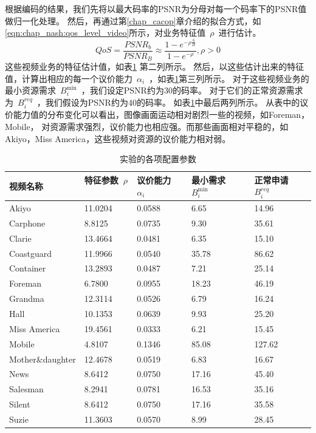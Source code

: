 根据编码的结果，我们先将以最大码率的PSNR为分母对每一个码率下的PSNR值做归一化处理。
然后，再通过第\ref{chap_cacop}章介绍的拟合方式，如\eqref{eqn:chap_nash:qos_level_video}所示，对业务特征值~$\rho$~进行估计。
\begin{equation}
QoS = \frac{PSNR_b}{PSNR_B} \approx \frac{1- e^{-\rho \frac{b}{B} }}{1-e^{-\rho}}, \rho > 0
\label{eqn:chap_nash:qos_level_video}
\end{equation}
这些视频业务的特征估计值，如表\ref{tab:chap_nash:before_simulation} 第二列所示。
然后，以这些估计出来的特征值，计算出相应的每一个议价能力~$\alpha_i$~，如表\ref{tab:chap_nash:before_simulation}第三列所示。
对于这些视频业务的最小资源需求~$B_i^{\min}$~，我们设定PSNR约为30的码率。
对于它们的正常资源需求为~$B_i^{req}$~，我们假设为PSNR约为40的码率。
如表\ref{tab:chap_nash:before_simulation}中最后两列所示。
从表中的议价能力值的分布变化可以看出，图像画面运动相对剧烈一些的视频，如Foreman，Mobile，
对资源需求强烈，议价能力也相应强。而那些画面相对平稳的，如Akiyo，Miss America，这些视频对资源的议价能力相对弱。
\begin{table}[tb]
    \wuhao
    \centering
    \caption{实验的各项配置参数}
    \begin{tabular*}{0.98\textwidth}{l p{}  p{}  p{}  p{} } 
    \toprule
    视频名称 &特征参数~$\rho$~ & 议价能力~$\alpha_i$~ & 最小需求~$B_i^{\min}$~ & 正常申请~$B_i^{req}$~ \\
    \midrule
Akiyo           	 & 11.0204 & 0.0588 & 6.65 & 14.96  \\ 
Carphone        	 & 8.8125 & 0.0735 & 9.30 & 35.61  \\ 
Clarie          	 & 13.4664 & 0.0481 & 6.35 & 15.10  \\ 
Coastguard      	 & 11.9966 & 0.0540 & 35.78 & 86.62  \\ 
Container       	 & 13.2893 & 0.0487 & 7.21 & 25.14  \\ 
Foreman         	 & 6.7800 & 0.0955 & 18.23 & 46.19  \\ 
Grandma         	 & 12.3114 & 0.0526 & 6.79 & 16.24  \\ 
Hall            	 & 10.1353 & 0.0639 & 9.93 & 25.20  \\ 
Miss America    	 & 19.4561 & 0.0333 & 6.21 & 15.45  \\ 
Mobile          	 & 4.8107 & 0.1346 & 85.08 & 127.62  \\ 
Mother\&daughter	 & 12.4678 & 0.0519 & 6.83 & 16.67  \\ 
News            	 & 8.6412 & 0.0750 & 17.16 & 45.40  \\ 
Salesman        	 & 8.2941 & 0.0781 & 16.53 & 35.16  \\ 
Silent          	 & 8.6412 & 0.0750 & 17.16 & 35.58  \\ 
Suzie           	 & 11.3603 & 0.0570 & 8.99 & 28.45  \\ 
    \bottomrule
         \end{tabular*}
    \label{tab:chap_nash:before_simulation}
\end{table}

